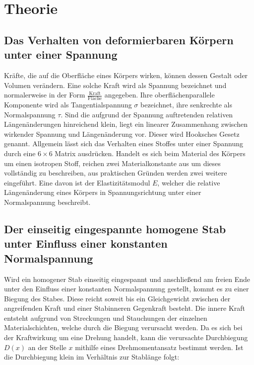 
\section{Theorie}
\label{sec:Theorie}

\subsection{Das Verhalten von deformierbaren Körpern unter einer Spannung}
Kräfte, die auf die Oberfläche eines Körpers wirken, können dessen Gestalt oder
 Volumen verändern. Eine solche Kraft wird als Spannung bezeichnet und normalerweise
  in der Form $\frac{\text{Kraft}}{\text{Fläche}}$ angegeben. Ihre oberflächenparallele
   Komponente wird als Tangentialspannung $\sigma$ bezeichnet, ihre senkrechte als Normalspannung $\tau$.
Sind die aufgrund der Spannung auftretenden relativen Längenänderungen hinreichend
 klein, liegt ein linearer Zusammenhang zwischen wirkender Spannung und Längenänderung vor.
      Dieser wird Hooksches Gesetz genannt.
       Allgemein lässt sich das Verhalten eines Stoffes unter einer Spannung durch eine
        $6\times6$ Matrix ausdrücken.
      Handelt es sich beim Material des Körpers um einen isotropen Stoff,
       reichen zwei Materialkonstante aus um dieses vollständig
        zu beschreiben, aus praktischen Gründen werden zwei weitere eingeführt.
         Eine davon ist der Elastizitätsmodul $E$, welcher die
         relative Längenänderung eines Körpers in Spannungsrichtung unter
          einer Normalspannung beschreibt.

\subsection{Der einseitig eingespannte homogene Stab unter Einfluss einer konstanten Normalspannung}
Wird ein homogener Stab einseitig eingespannt und anschließend am freien Ende unter den Einfluss
 einer konstanten Normalspannung gestellt, kommt es zu einer Biegung des Stabes. Diese
  reicht soweit bis ein Gleichgewicht zwischen der angreifenden Kraft und einer Stabinneren Gegenkraft besteht. Die
   innere Kraft entsteht aufgrund von Streckungen und Stauchungen der einzelnen
    Materialschichten, welche durch die Biegung verursacht werden. Da es sich bei
     der Kraftwirkung um eine Drehung handelt, kann die verursachte Durchbiegung
      $D(x)$ an der Stelle $x$ mithilfe eines Drehmomentansatz bestimmt werden.
       Ist die Durchbiegung klein im Verhältnis zur Stablänge folgt:


